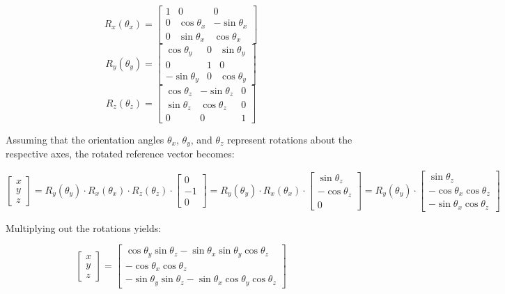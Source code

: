 \documentclass{article}
\begin{document}
\[
R_x(\theta_x) =
\begin{bmatrix}
1 & 0 & 0 \\
0 & \cos\theta_x & -\sin\theta_x \\
0 & \sin\theta_x & \cos\theta_x
\end{bmatrix}\]
\[R_y(\theta_y) =
\begin{bmatrix}
\cos\theta_y & 0 & \sin\theta_y \\
0 & 1 & 0 \\
-\sin\theta_y & 0 & \cos\theta_y
\end{bmatrix}\]
\[R_z(\theta_z) =
\begin{bmatrix}
\cos\theta_z & -\sin\theta_z & 0 \\
\sin\theta_z & \cos\theta_z & 0 \\
0 & 0 & 1
\end{bmatrix}
\]

Assuming that the orientation angles $\theta_x$, $\theta_y$, and $\theta_z$ represent rotations about the respective axes, the rotated reference vector becomes:

\[
\begin{bmatrix}
x\\
y\\
z
\end{bmatrix}
=
R_y(\theta_y) \cdot R_x(\theta_x) \cdot R_z(\theta_z) \cdot
\begin{bmatrix}
0\\
-1\\
0
\end{bmatrix}
=
R_y(\theta_y) \cdot R_x(\theta_x) \cdot
\begin{bmatrix}
\sin\theta_z\\
-\cos\theta_z\\
0
\end{bmatrix}
=
R_y(\theta_y) \cdot
\begin{bmatrix}
\sin\theta_z\\
-\cos\theta_x \cos\theta_z\\
-\sin\theta_x \cos\theta_z
\end{bmatrix}
\]

Multiplying out the rotations yields:

\[
\begin{bmatrix}
x\\
y\\
z
\end{bmatrix}
=
\begin{bmatrix}
\cos\theta_y \sin\theta_z - \sin\theta_x \sin\theta_y \cos\theta_z \\
-\cos\theta_x \cos\theta_z \\
-\sin\theta_y \sin\theta_z - \sin\theta_x \cos\theta_y \cos\theta_z
\end{bmatrix}
\]
\end{document}
